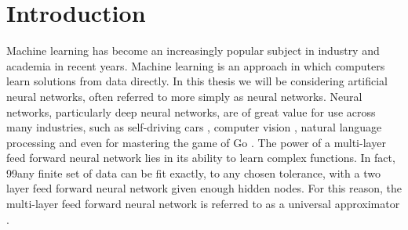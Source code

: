\documentclass[letterpaper,12pt,titlepage,oneside,final]{book}
\begin{document}
	
	 
	
	\chapter{Introduction}
	
	Machine learning has become an increasingly popular subject in industry and academia in recent years. Machine learning is an approach in which computers learn solutions from data directly. In this thesis we will be considering artificial neural networks, often referred to more simply as neural networks. Neural networks, particularly deep neural networks, are of great value for use across many industries, such as self-driving cars \cite{bojarski2016end}, computer vision \cite{krizhevsky2012imagenet}, natural language processing \cite{ma2002natural} and even for mastering the game of Go \cite{silver2016mastering}. The power of a multi-layer feed forward neural network lies in its ability to learn complex functions. In fact, 99any finite set of data can be fit exactly, to any chosen tolerance, with a two layer feed forward neural network given enough hidden nodes. For this reason, the multi-layer feed forward neural network is referred to as a universal approximator \cite{hornik1989multilayer}. 
	
\end{document}
